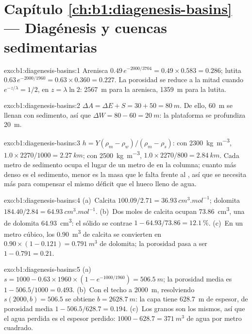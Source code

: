 \section*{Capítulo \ref{ch:b1:diagenesis-basins} --- Diagénesis y cuencas sedimentarias}

\begin{solution}{exo:b1:diagenesis-basins:1}
Arenisca $0.49\,e^{-2000/3704} = 0.49\times0.583 = \num{0.286}$; lutita
$0.63\,e^{-2000/1960} = 0.63\times0.360 = \num{0.227}$. La porosidad se reduce a la mitad cuando
$e^{-z/\lambda} = 1/2$, en $z = \lambda\ln 2$: \qty{2567}{m} para la arenisca,
\qty{1359}{m} para la lutita.
\end{solution}

\begin{solution}{exo:b1:diagenesis-basins:2}
$\Delta A = \Delta E + S = 30 + 50 = \qty{80}{m}$. De ello, \qty{60}{m} se llenan con sedimento, así que $\Delta W = 80 - 60 = \qty{20}{m}$: la plataforma se
profundiza \qty{20}{m}.
\end{solution}

\begin{solution}{exo:b1:diagenesis-basins:3}
$h = Y(\rho_m - \rho_w)/(\rho_m - \rho_s)$: con \qty{2300}{kg.m^{-3}}, $1.0\times2270/1000 = \qty{2.27}{km}$; con \qty{2500}{kg.m^{-3}}, $1.0\times2270/800 = \qty{2.84}{km}$. Cada metro de
sedimento ocupa el lugar de un metro de  en la columna; cuanto más denso es el sedimento, menor es la masa que le falta frente al , así que se necesita más para
compensar el mismo déficit que el hueco lleno de agua.
\end{solution}

\begin{solution}{exo:b1:diagenesis-basins:4}
(a)~Calcita $100.09/2.71 = \qty{36.93}{cm^3.mol^{-1}}$; dolomita $184.40/2.84
= \qty{64.93}{cm^3.mol^{-1}}$. (b)~Dos moles de calcita ocupan
\qty{73.86}{cm^3}, una de dolomita \qty{64.93}{cm^3}: el sólido se contrae $1 - 64.93/73.86 = \qty{12.1}{\%}$. (c)~En un metro cúbico, los \qty{0.90}{m^3}
de calcita se convierten en $0.90\times(1 - 0.121) = \qty{0.791}{m^3}$ de dolomita; la porosidad pasa a ser $1 - 0.791 = \num{0.21}$.
\end{solution}

\begin{solution}{exo:b1:diagenesis-basins:5}
(a)~$s = 1000 - 0.63\times1960\times(1 - e^{-1000/1960}) = \qty{506.5}{m}$; la porosidad media es $1 - 506.5/1000 = \num{0.493}$. (b)~Con el techo a
\qty{2000}{m}, resolviendo $s(2000, b) = 506.5$ se obtiene $b = \qty{2628.7}{m}$: la capa tiene \qty{628.7}{m} de espesor, de porosidad media $1 - 506.5/628.7 = \num{0.194}$.
(c)~Los granos son los mismos, así que el agua perdida es el espesor perdido: $1000 - 628.7 = \qty{371}{m^3}$ de agua por metro cuadrado.
\end{solution}

